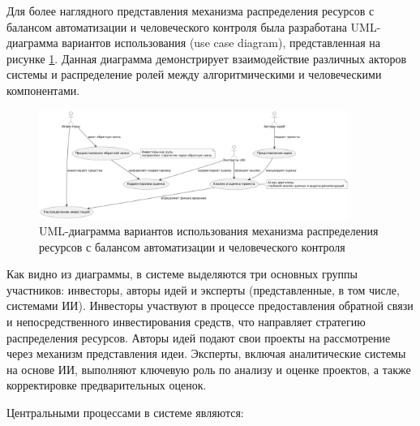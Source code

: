 \documentclass[
    14pt,
    specialist,
    candidate, %
    subf, %
    href,
    dotsinheaders=false
]{disser}
\begin{document}

Для более наглядного представления механизма распределения ресурсов с балансом автоматизации и человеческого контроля была разработана UML-диаграмма вариантов использования (use case diagram), представленная на рисунке \ref{fig:uml-use-case-diagram}. Данная диаграмма демонстрирует взаимодействие различных акторов системы и распределение ролей между алгоритмическими и человеческими компонентами.

\begin{figure}[h]
  \centering
  \includegraphics[width=0.9\textwidth]{./assets/uml-use-case-diagram.png}
  \caption{UML-диаграмма вариантов использования механизма распределения ресурсов с балансом автоматизации и человеческого контроля}
  \label{fig:uml-use-case-diagram}
\end{figure}

Как видно из диаграммы, в системе выделяются три основных группы участников: инвесторы, авторы идей и эксперты (представленные, в том числе, системами ИИ). Инвесторы участвуют в процессе предоставления обратной связи и непосредственного инвестирования средств, что направляет стратегию распределения ресурсов. Авторы идей подают свои проекты на рассмотрение через механизм представления идеи. Эксперты, включая аналитические системы на основе ИИ, выполняют ключевую роль по анализу и оценке проектов, а также корректировке предварительных оценок.

Центральными процессами в системе являются:
\end{document}
